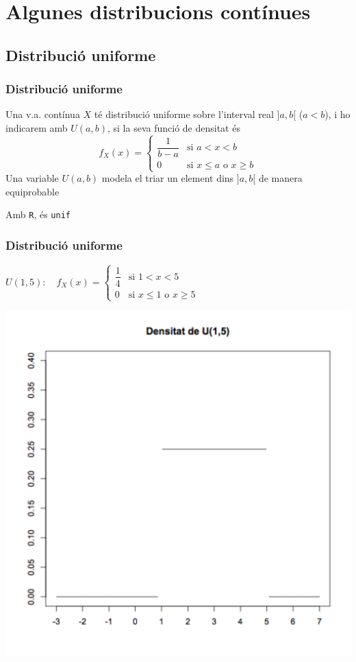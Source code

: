 \documentclass[12pt,t]{beamer}\usepackage[]{graphicx}\usepackage[]{color}
\renewcommand{\emph}[1]{{\color{red}#1}}
\renewcommand{\leq}{\leqslant}
\renewcommand{\geq}{\geqslant}
\theoremstyle{plain}
\theoremstyle{definition}
\begin{document}
\section{Algunes distribucions contínues}

\subsection{Distribució  uniforme}

\begin{frame}[fragile]
\frametitle{Distribució uniforme}
Una v.a. contínua $X$ té \emph{distribució uniforme}
sobre l'interval real
$]a,b[$ ($a<b$), i ho indicarem amb \emph{$U(a,b)$}, si la seva funció de densitat és
 $$
 f_X(x)=
 \left\{\begin{array}{ll}
\dfrac{1}{b-a} & \mbox{si } a<x<b\\[2ex] 0  & \mbox{si $x\leq a$ o $x\geq b$}
\end{array}
\right. $$ 
Una variable $U(a,b)$ modela el triar un element dins $]a,b[$ de manera equiprobable
\medskip

Amb {\tt R}, és \texttt{unif}

\end{frame}


\begin{frame} 
\frametitle{Distribució uniforme}
 $U(1,5):\quad f_X(x)=
 \left\{\begin{array}{ll}
\dfrac{1}{4} & \mbox{si } 1<x<5\\[2ex] 0  & \mbox{si $x\leq 1$ o $x\geq 5$}
\end{array}
\right. $

\begin{center}
\includegraphics[width=0.6\linewidth]{dunif15}
\end{center}



\end{frame}
\end{document}
